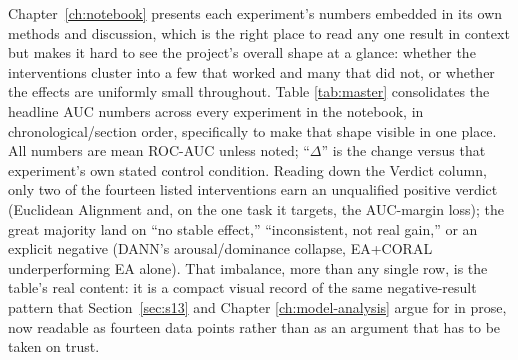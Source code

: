 \documentclass[11pt]{report}
\begin{document}
Chapter~\ref{ch:notebook} presents each experiment's numbers embedded in its
own methods and discussion, which is the right place to read any one result
in context but makes it hard to see the project's overall shape at a glance:
whether the interventions cluster into a few that worked and many that
did not, or whether the effects are uniformly small throughout. Table
\ref{tab:master} consolidates the headline AUC numbers across every
experiment in the notebook, in chronological/section order, specifically to
make that shape visible in one place. All numbers are mean ROC-AUC unless
noted; ``$\Delta$'' is the change versus that experiment's own stated
control condition. Reading down the Verdict column, only two of the
fourteen listed interventions earn an unqualified positive verdict
(Euclidean Alignment and, on the one task it targets, the AUC-margin loss);
the great majority land on ``no stable effect,'' ``inconsistent, not real
gain,'' or an explicit negative (DANN's arousal/dominance collapse, EA+CORAL
underperforming EA alone). That imbalance, more than any single row, is the
table's real content: it is a compact visual record of the same
negative-result pattern that Section~\ref{sec:s13} and Chapter
\ref{ch:model-analysis} argue for in prose, now readable as fourteen
data points rather than as an argument that has to be taken on trust.
\end{document}
